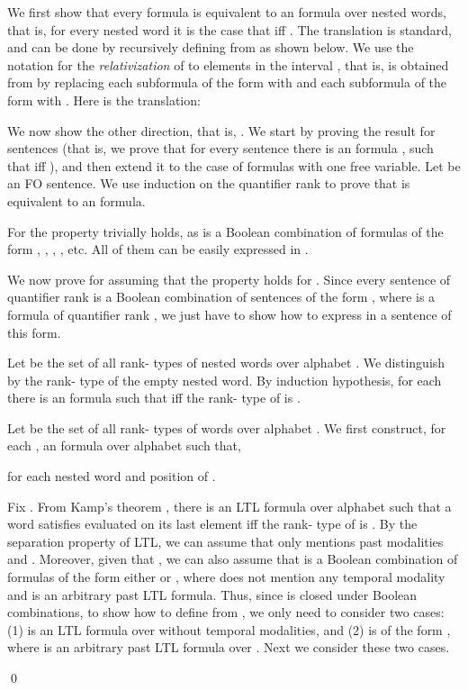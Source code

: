 \documentclass{LMCS}
\newcommand{\aProof}[2]{\vspace{2mm}{\noindent\em Proof of
#1.~}#2\qed}
\theoremstyle{plain}
\theoremstyle{definition}
\begin{document}
\aProof{Theorem \ref{expcompl-one}}{We first show that every
 formula  is equivalent to an  formula
 over nested words, that is, for every nested word
 it is the case that  iff .  The translation is standard, and can be done by
recursively defining  from  as shown
below.  We use the notation  for the {\em
relativization} of  to elements in the interval ,
that is,  is obtained from  by replacing
each subformula of the form  with  and each subformula of the form
 with .  Here is the translation:

{\small


}


We now show the other direction, that is, .  We start by proving the result for  sentences
(that is, we prove that for every  sentence  there is an
 formula , such that  iff
), and then extend it to the case of 
formulas with one free variable.  Let  be an FO sentence. We use
induction on the quantifier rank to prove that  is equivalent to
an  formula.

For  the property trivially holds, as  is a Boolean
combination of formulas of the form , , , , etc. All of them can be easily expressed in
.

We now prove for  assuming that the property holds for .
Since every  sentence of quantifier rank  is a Boolean
combination of  sentences of the form , where
 is a formula of quantifier rank , we just have to show
how to express in  a sentence of this form.

Let  be the set of all rank- types of nested words over
alphabet . We distinguish by
 the rank- type of the empty nested word. By
induction hypothesis, for each  there is an
 formula  such that  iff the rank- type of  is .  



Let  be the set of all rank- types of words over
alphabet . We first construct, for each , an   formula  over
alphabet   such that,

 for each nested 
word  and position  of . 
    
Fix .  From Kamp's theorem \cite{Kamp}, there is
an LTL formula  over alphabet 
such that a word  satisfies  evaluated on its last
element iff the rank- type of  is . By the
separation property of LTL, we can assume that  only mentions
past modalities  and . Moreover, given that , we can also assume that  is a Boolean
combination of formulas of the form either  or , where  does not mention any temporal modality and
 is an arbitrary past LTL formula. Thus, since
 is closed under Boolean combinations, to show how
to define  from , we only need to
consider two cases: (1)  is an LTL formula over  without temporal modalities, and (2)  is
of the form , where  is an arbitrary past LTL
formula over . Next we consider these two cases.

}
\end{document}
